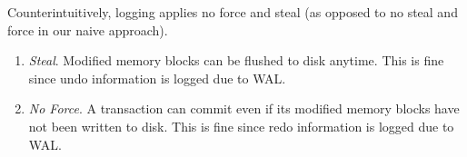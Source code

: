     \begin{theorem}
      \label{thm:no-force-and-seal-of-logging}
      Counterintuitively, logging applies no force and steal (as opposed to no steal and force in our naive approach). 
      \begin{enumerate}
        \item \textit{Steal}. Modified memory blocks can be flushed to disk anytime. This is fine since undo information is logged due to WAL. 
        \item \textit{No Force}. A transaction can commit even if its modified memory blocks have not been written to disk. This is fine since redo information is logged due to WAL. 
      \end{enumerate}
    \end{theorem} 

